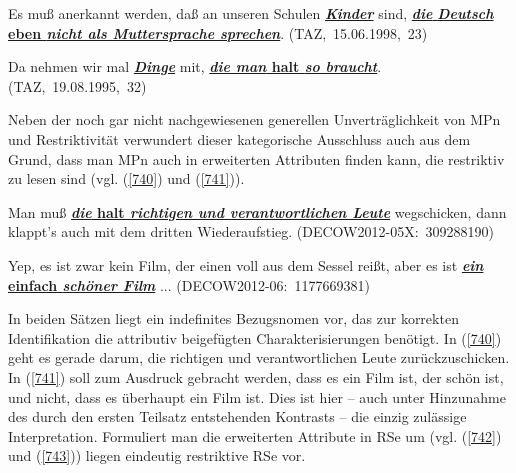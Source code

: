 \begin{exe}
	\ex\label{738} 
	Es muß anerkannt werden, daß an unseren Schulen \underline{\textit{\textbf{Kinder}}} sind, \underline{\textbf{\textit{die 		}}} \underline{\textbf{\textit{Deutsch}} \textbf{eben \textit{nicht als Muttersprache sprechen}}}. 		
	\hfill\hbox {(TAZ, 15.06.1998, 23)}
\end{exe}	

\begin{exe}
	\ex\label{739} 
	Da nehmen wir mal \underline{\textit{\textbf{Dinge}}} mit, \underline{\textbf{\textit{die man} halt \textit{so braucht}}}.
	\newline
	\hbox{}\hfill\hbox {(TAZ, 19.08.1995, 32)}
	\newline
	\hbox{}\hfill\hbox{\citet[68]{Kwon2005}}	
\end{exe}					
Neben der noch gar nicht nachgewiesenen generellen Unverträglichkeit von MPn und Restriktivität verwundert dieser kategorische Ausschluss auch aus dem Grund, dass man MPn auch in erweiterten Attributen finden kann, die restriktiv zu lesen sind (vgl. (\ref{740}) und (\ref{741})).

\begin{exe}
	\ex\label{740} 
	Man muß \underline{\textbf{\textit{die} halt \textit{richtigen und verantwortlichen Leute}}} wegschicken, dann klappt's 		auch mit dem dritten Wiederaufstieg.		
	\newline
	\hbox{}\hfill\hbox {(DECOW2012-05X: 309288190)}
\end{exe}
\vspace{-0.65cm}
\begin{exe}
	\ex\label{741} 
	Yep, es ist zwar kein Film, der einen voll aus dem Sessel reißt, aber es ist \underline{\textbf{\textit{ein} einfach 			\textit{schöner Film}}} ... 	
	\hfill\hbox {(DECOW2012-06: 1177669381)}
\end{exe}	              
In beiden Sätzen liegt ein indefinites Bezugsnomen vor, das zur korrekten Identifikation die attributiv beigefügten Charakterisierungen benötigt. In (\ref{740}) geht es gerade darum, die richtigen und verantwortlichen Leute zurückzuschicken. In (\ref{741}) soll zum Ausdruck gebracht werden, dass es ein Film ist, der schön ist, und nicht, dass es überhaupt ein Film ist. Dies ist hier – auch unter Hinzunahme des durch den ersten Teilsatz entstehenden Kontrasts – die einzig zulässige Interpretation. Formuliert man die erweiterten Attribute in RSe um (vgl. (\ref{742}) und (\ref{743})) liegen eindeutig restriktive RSe vor.

